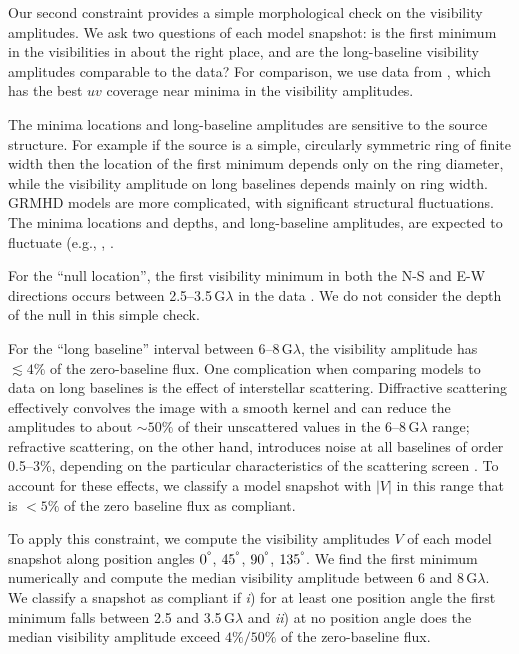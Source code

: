 Our second constraint provides a simple morphological check on the visibility amplitudes.
We ask two questions of each model snapshot: is the first minimum in the visibilities in about the right place,
and are the long-baseline visibility amplitudes comparable to the data?
For comparison, we use data from \aprilvii, which has the best $uv$ coverage near minima in the visibility amplitudes.

The minima locations and long-baseline amplitudes are sensitive to the source structure.
For example if the source is a simple, circularly symmetric ring of finite width then the location of the first minimum depends only on the ring diameter, while the visibility amplitude on long baselines depends mainly on ring width.
GRMHD models are more complicated, with significant structural fluctuations.
The minima locations and depths, and long-baseline amplitudes, are expected to fluctuate (e.g., \citealt{2018ApJ...856..163M}, .

For the ``null location'', the first visibility minimum in both the N-S and E-W directions occurs between 2.5--3.5\,$\mathrm{G}\lambda$ in the data .
We do not consider the depth of the null in this simple check.

For the ``long baseline'' interval between 6--8\,$\mathrm{G}\lambda$, the visibility amplitude has $\lesssim 4\%$ of the zero-baseline flux.
One complication when comparing models to data on long baselines is the effect of interstellar scattering.
Diffractive scattering effectively convolves the image with a smooth kernel and can reduce the amplitudes to about $\sim 50\%$ of their unscattered values in the 6--8\,$\mathrm{G}\lambda$ range;
refractive scattering, on the other hand, introduces noise at all baselines of order 0.5--3\%, depending on the particular characteristics of the scattering screen \citep{2018arXiv180501242P, 2018ApJ...865..104J}.
To account for these effects, we classify a model snapshot with $|V|$ in this range that is $< 5\%$ of the zero baseline flux as compliant.

To apply this constraint, we compute the visibility amplitudes $V$ of each model snapshot along position angles $0^\degree$, $45^\degree$, $90^\degree$, $135^\degree$.  We find the first minimum numerically and compute the median visibility amplitude between 6 and 8\,$\mathrm{G}\lambda$.
We classify a snapshot as compliant if \emph{i}) for at least one position angle the first minimum falls between 2.5 and 3.5\,$\mathrm{G}\lambda$ and \emph{ii}) at no position angle does the median visibility amplitude exceed $4\% / 50\%$ of the zero-baseline flux.

